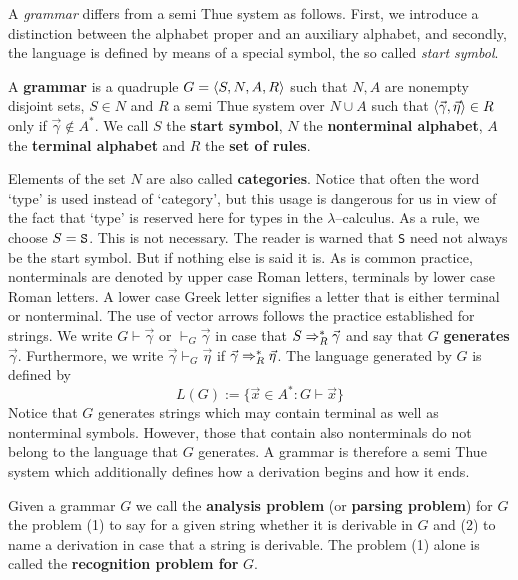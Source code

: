 A {\it grammar\/} differs from a semi Thue system as follows.
First, we introduce a distinction between the alphabet proper
and an auxiliary alphabet, and secondly,  the language is defined
by means of a special symbol, the so called {\it start symbol}.
\begin{defn}
A \textbf{grammar} is a quadruple $G = \langle S, N, A, R\rangle$
such that $N, A$ are nonempty disjoint sets, $S \in N$ and $R$ a
semi Thue system over $N \cup A$ such that
$\langle \vec{\gamma}, \vec{\eta}\rangle \in R$ only if
$\vec{\gamma} \not\in A^{\ast}$. We call $S$ the
\textbf{start symbol}, $N$ the \textbf{nonterminal alphabet},
$A$ the \textbf{terminal alphabet} and $R$ the \textbf{set of rules}.
\end{defn}
Elements of the set $N$ are also called \textbf{categories}. 
Notice that often the word `type' is used instead of `category', 
but this usage is dangerous for us in view of the fact that `type' 
is reserved here for types in the $\lambda$--calculus. 
As a rule, we choose $S = \mbox{\tt S}$. This is not necessary.
The reader is warned that {\tt S} need not always be the start
symbol. But if nothing else is said it is. As is common practice,
nonterminals are denoted by upper case Roman letters, terminals by
lower case Roman letters. A lower case Greek letter signifies
a letter that is either terminal or nonterminal. The use of
vector arrows follows the practice established for strings. We
write $G \vdash \vec{\gamma}$ or $\vdash_G \vec{\gamma}$ in case
that $S \Rightarrow^{\ast}_R \vec{\gamma}$ and say that $G$ \textbf{generates}
$\vec{\gamma}$. Furthermore, we write $\vec{\gamma} \vdash_G
\vec{\eta}$ if $\vec{\gamma} \Rightarrow^{\ast}_R \vec{\eta}$. The
language generated by $G$ is defined by
\begin{equation}
L(G) := \{\vec{x} \in A^{\ast} : G \vdash \vec{x}\} 
\end{equation}
Notice that $G$ generates strings which may contain terminal
as well as nonterminal symbols. However, those that contain also
nonterminals do not belong to the language that $G$ generates.
A grammar is therefore a semi Thue system which additionally 
defines how a derivation begins and how it ends.

Given a grammar $G$ we call the \textbf{analysis problem}
(or \textbf{parsing problem}) for $G$ the problem (1) to say for
a given string whether it is derivable in $G$ and (2) to name
a derivation in case that a string is derivable. The problem (1)
alone is called the \textbf{recognition problem for} $G$.


